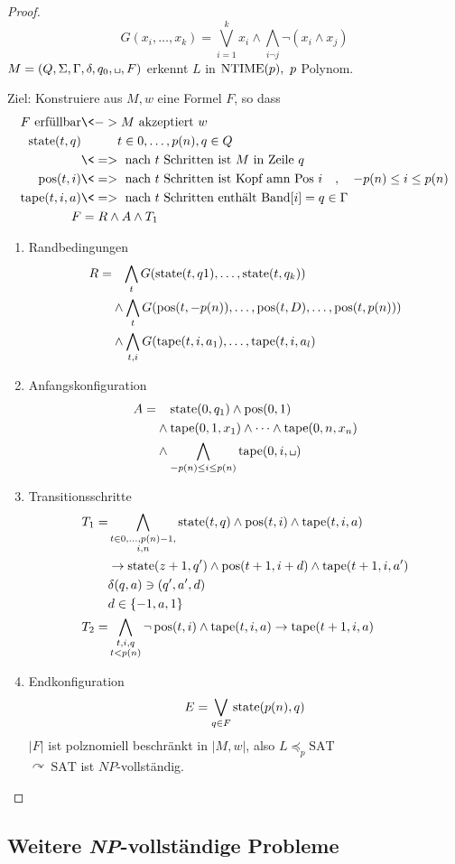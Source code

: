 \begin{proof}
	\[ G(x_i,\dots,x_k) = \bigvee_{i=1}^k x_i\land \bigwedge_{i\neg j}\neg (x_i\land x_j) \]
	$M=(Q,\Sigma,\Gamma,\delta,q_0,\blank,F)$ erkennt $L$ in $\operatorname{NTIME}(p),\ p$ Polynom.
	
	Ziel: Konstruiere aus $M,w$ eine Formel $F$, so dass
	\begin{align*}
		F\text{ erfüllbar} &\<-> M\text{ akzeptiert }w\\
		\state(t,q) &\phantom{\<->} t\in 0,\dots,p(n), q\in Q\\
		&\<=>\text{ nach $t$ Schritten ist $M$ in Zeile }q\\
		\pos(t,i) &\<=>\text{ nach $t$ Schritten ist Kopf amn Pos } i\quad,\quad -p(n)\leq i\leq p(n)\\
		\tape(t,i,a) &\<=>\text{ nach $t$ Schritten enthält Band}[i] = q\in\Gamma\\
		F &= R \land A\land T_1
	\end{align*}
	\begin{enumerate}
	\item Randbedingungen
		\begin{align*}
			R =&\phantom{\land}\, \bigwedge_t G(\operatorname{state}(t,q1),\dots,\operatorname{state}(t,q_k))\\
			& \land \bigwedge_t G(\operatorname{pos}(t,-p(n)),\dots,\operatorname{pos}(t,D),\dots,\operatorname{pos}(t,p(n)))\\
			& \land \bigwedge_{t,i} G(\operatorname{tape}(t,i,a_1),\dots,\operatorname{tape}(t,i,a_l)
		\end{align*}
	\item Anfangskonfiguration
		\begin{align*}
			A =&\phantom{\land}\; \state(0,q_1)\land \pos(0,1)\\
			&\land\tape(0,1,x_1)\land\dots\land\tape(0,n,x_n)\\
			&\land\bigwedge_{-p(n)\leq i\leq p(n)} \tape(0,i,\blank)
		\end{align*}
	\item Transitionsschritte
	\begin{align*}
		T_1 =& \bigwedge_{\substack{t\in 0,\dots,p(n)-1,\\i,n}} \state(t,q)\land \pos(t,i) \land \tape(t,i,a)\\
		&\-> \state(z+1,q')\land \pos(t+1,i+d) \land \tape(t+1,i,a')\\
		&\delta(q,a)\ni(q',a',d)\\
		&d\in\{-1,a,1\}\\
		T_2 =& \bigwedge_{\substack{t,i,q\\t<p(n)}} \neg \pos(t,i)\land \tape(t,i,a) \-> \tape(t+1,i,a)
	\end{align*}
	\item Endkonfiguration
		\[ E = \bigvee_{q\in F} \operatorname{state}(p(n),q) \]
		$|F|$ ist polznomiell beschränkt in $|M,w|$, also $L\preceq_p \mathrm{SAT}$\\
		$\curvearrowright\ \mathrm{SAT}$ ist $NP$-vollständig.
	\end{enumerate}
\end{proof}

\subsection{Weitere \textit{NP}-vollständige Probleme}


